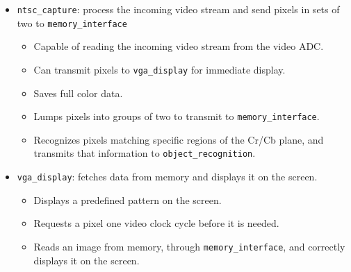 \documentclass{article}
\begin{document}
\begin{itemize}
\item[] {\tt ntsc\_capture}: process the incoming video stream and send pixels in sets of two to {\tt memory\_interface}
	\begin{itemize}
	\item Capable of reading the incoming video stream from the video ADC.
	\item Can transmit pixels to {\tt vga\_display} for immediate display.
	\item Saves full color data.
	\item Lumps pixels into groups of two to transmit to {\tt memory\_interface}.
	\item Recognizes pixels matching specific regions of the Cr/Cb plane, and transmits that information to {\tt object\_recognition}.
	\end{itemize}

\item[] {\tt vga\_display}: fetches data from memory and displays it on the screen.
	\begin{itemize}
	\item Displays a predefined pattern on the screen.
	\item Requests a pixel one video clock cycle before it is needed.
	\item Reads an image from memory, through {\tt memory\_interface}, and correctly displays it on the screen.
	\end{itemize}

\end{itemize}
\end{document}
